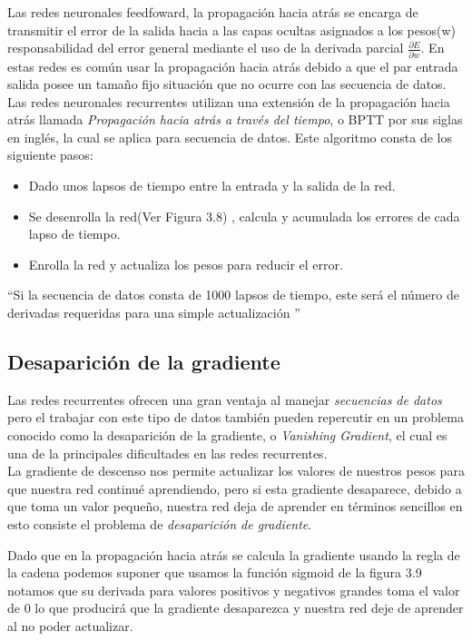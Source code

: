 Las redes neuronales feedfoward, la propagación hacia atrás se encarga de transmitir el error de la salida hacia a las capas ocultas asignados a los pesos(w) responsabilidad del error general mediante el uso de la derivada parcial $\frac{ { \partial } E } { \partial w }$. En estas redes es común usar la propagación hacia atrás debido a que el par entrada salida posee un tamaño fijo situación que no ocurre con las secuencia de datos.\\
 Las redes neuronales recurrentes utilizan una extensión de la propagación hacia atrás llamada \textit{Propagación hacia atrás a través del tiempo}, o BPTT  por sus siglas en inglés, la cual se aplica para secuencia de datos.
Este algoritmo consta de los siguiente pasos:
\begin{itemize}
	\item Dado unos lapsos de tiempo entre la entrada y la salida de la red.
	\item Se desenrolla la red(Ver Figura 3.8) , calcula y acumulada los errores de cada lapso de tiempo.
	\item Enrolla la red y actualiza los pesos para reducir el error.
	
\end{itemize}
\textquotedblleft Si la secuencia de datos consta de 1000 lapsos de tiempo, este será el número de derivadas requeridas para una simple actualización \textquotedblright \cite{WEBSITE:20}

\subsection{Desaparición de la gradiente}
Las redes recurrentes ofrecen una gran ventaja al manejar \textit{secuencias de datos} pero el trabajar con este tipo de datos también pueden repercutir en un problema conocido como la desaparición de la gradiente, o \textit{Vanishing Gradient}, el cual es una de la principales dificultades en las redes recurrentes.\\
 La gradiente de descenso nos permite actualizar los valores de nuestros pesos para que nuestra red continué aprendiendo, pero si esta gradiente desaparece, debido a que toma un valor pequeño, nuestra red deja de aprender en términos sencillos en esto consiste el problema de \textit{desaparición de gradiente}.

Dado que en la propagación hacia atrás se calcula la gradiente usando la regla de la cadena podemos suponer que usamos la función sigmoid de la figura 3.9 notamos que su derivada para valores positivos y negativos grandes toma el valor de 0 lo que producirá que la gradiente desaparezca y nuestra red deje de aprender al no poder actualizar.


